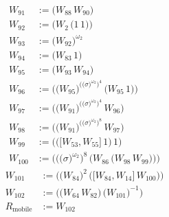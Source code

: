 \begin{align*}
W_{91} &:= \bigl(W_{88}\,W_{90}\bigr) \\
W_{92} &:= \bigl(W_{2}\,\bigl(1\,1\bigr)\bigr) \\
W_{93} &:= \bigl(W_{92}\bigr)^{\omega_2} \\
W_{94} &:= \bigl(W_{83}\,1\bigr) \\
W_{95} &:= \bigl(W_{93}\,W_{94}\bigr) \\
W_{96} &:= \bigl(\bigl(W_{95}\bigr)^{\bigl(\bigl(\sigma\bigr)^{\omega_2}\bigr)^{4}}\,\bigl(W_{95}\,1\bigr)\bigr) \\
W_{97} &:= \bigl(\bigl(W_{91}\bigr)^{\bigl(\bigl(\sigma\bigr)^{\omega_2}\bigr)^{4}}\,W_{96}\bigr) \\
W_{98} &:= \bigl(\bigl(W_{91}\bigr)^{\bigl(\bigl(\sigma\bigr)^{\omega_2}\bigr)^{8}}\,W_{97}\bigr) \\
W_{99} &:= \bigl(\bigl(\bigl[W_{53},W_{55}\bigr]\,1\bigr)\,1\bigr) \\
W_{100} &:= \bigl(\bigl(\bigl(\sigma\bigr)^{\omega_2}\bigr)^{8}\,\bigl(W_{86}\,\bigl(W_{98}\,W_{99}\bigr)\bigr)\bigr)
\end{align*}
\begin{align*}
W_{101} &:= \bigl(\bigl(W_{84}\bigr)^{2}\,\bigl(\bigl[W_{84},W_{14}\bigr]\,W_{100}\bigr)\bigr) \\
W_{102} &:= \bigl(\bigl(W_{64}\,W_{82}\bigr)\,\bigl(W_{101}\bigr)^{-1}\bigr) \\
R_{\mathrm{mobile}} &:= W_{102}
\end{align*}

